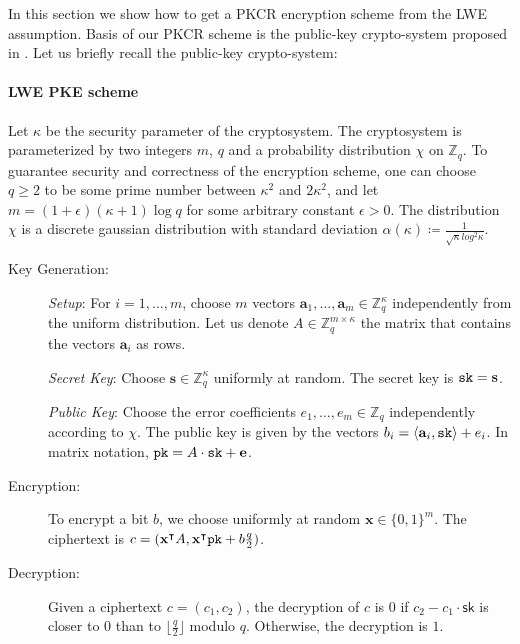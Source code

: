 
In this section we show how to get a PKCR encryption scheme from the LWE assumption.
Basis of our PKCR scheme is the public-key crypto-system proposed in \cite{C:Regev06}. Let us briefly recall the public-key crypto-system:

\paragraph{LWE PKE scheme \cite{C:Regev06}}
Let $\kappa$ be the security parameter of the cryptosystem. The cryptosystem is parameterized by two integers $m$, $q$ and a probability distribution $\chi$ on $\mathbb{Z}_q$. To guarantee security and correctness of the encryption scheme, one can choose $q \ge 2$ to be some prime number between $\kappa^2$ and $2\kappa^2$, and let $m = (1+\epsilon)(\kappa+1)\log q$ for some arbitrary constant $\epsilon > 0$. The distribution $\chi$ is a discrete gaussian distribution with standard deviation $\alpha(\kappa) \coloneqq \frac{1}{\sqrt{\kappa}log^2\kappa}$.

\begin{description}
	\item[Key Generation:]
	
	\emph{Setup}: For $i = 1,\dots,m$, choose $m$ vectors $\mathbf{a}_1,\dots,\mathbf{a}_m \in \mathbb{Z}_q^{\kappa}$ independently from the uniform distribution. Let us denote $A \in \mathbb{Z}_{q}^{m\times \kappa}$ the matrix that contains the vectors $\mathbf{a}_i$ as rows.
	
	\emph{Secret Key}: Choose $\mathbf{s} \in \mathbb{Z}_{q}^{\kappa}$ uniformly at random. The secret key is $\texttt{sk} = \mathbf{s}$.
	
	\emph{Public Key}: Choose the error coefficients $e_1,\dots,e_m \in \mathbb{Z}_q$ independently according to $\chi$. The public key is given by the vectors $b_i = \langle \mathbf{a}_i,\texttt{sk} \rangle + e_i$. In matrix notation, $\texttt{pk} = A\cdot \texttt{sk} + \mathbf{e}$.
	
	\item[Encryption:] To encrypt a bit $b$, we choose uniformly at random $\mathbf{x} \in \{0,1\}^{m}$. The ciphertext is $c = (\mathbf{x}^{\intercal} A, \mathbf{x}^{\intercal} \texttt{pk} + b\frac{q}{2})$.
	
	\item[Decryption:] Given a ciphertext $c = (c_1,c_2)$, the decryption of $c$ is $0$ if $c_2 - c_1\cdot \mathsf{sk}$ is closer to $0$ than to $\lfloor \frac{q}{2} \rfloor$ modulo $q$. Otherwise, the decryption is $1$.
\end{description}

